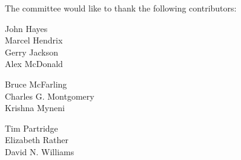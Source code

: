 The committee would like to thank the following contributors:

\begin{minipage}[t]{.3\linewidth}
John		Hayes \\
Marcel		Hendrix \\
Gerry		Jackson \\
Alex		McDonald \\
\end{minipage}
\hfill
\begin{minipage}[t]{.3\linewidth}
Bruce		McFarling \\
Charles G.	Montgomery \\
Krishna		Myneni \\
\end{minipage}
\hfill
\begin{minipage}[t]{.3\linewidth}
Tim		Partridge \\
Elizabeth	Rather \\
David N.	Williams \\
\end{minipage}